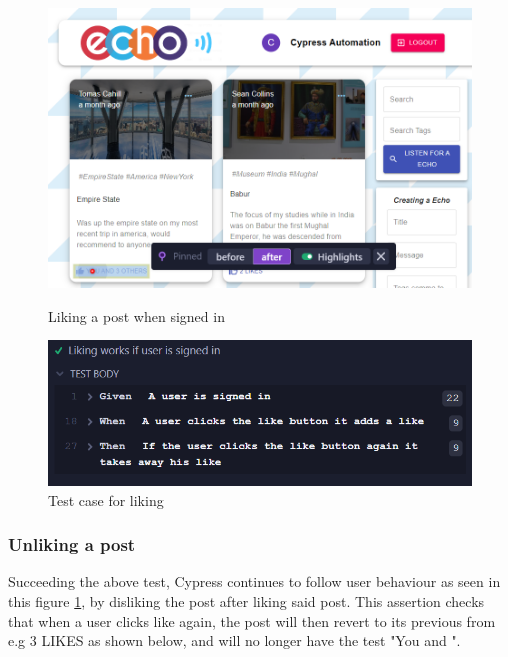 \begin{figure}[ht]
\begin{minipage}[b]{0.4\linewidth}
    \centering
    \includegraphics[width=\linewidth]{images/LikingSignIn}
    \caption{Liking a post when signed in}
    \label{image:LikingSignIn}
\end{minipage}
    \hspace{0.5cm}
    \begin{minipage}[b]{0.4\linewidth}
    \centering
   \includegraphics[width=\linewidth]{images/LikingFeature}
    \caption{Test case for liking}
    \label{image:LikingFeature}
\end{minipage}
\end{figure}

\subsubsection{Unliking a post}
Succeeding the above test, Cypress continues to follow user behaviour as seen in this figure \ref{image:LikingFeature}, by disliking the post after liking said post. This assertion checks that when a user clicks like again, the post will then revert to its previous from e.g 3 LIKES as shown below, and will no longer have the test "You and ".


